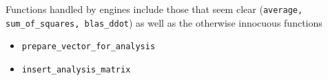\documentclass[12pt]{article}
\begin{document}
 Functions handled by engines include those that seem clear ({\tt average,
 sum\_of\_squares, blas\_ddot}) as well as the otherwise innocuous functions
\begin{itemize}
  \item {\tt prepare\_vector\_for\_analysis}
  \item {\tt insert\_analysis\_matrix}
\end{itemize}
\end{document}
